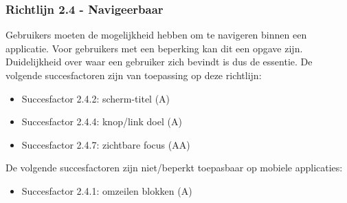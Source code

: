 \subsubsection{Richtlijn 2.4 - Navigeerbaar}
Gebruikers moeten de mogelijkheid hebben om te navigeren binnen een applicatie. Voor gebruikers met een beperking kan dit een opgave zijn. Duidelijkheid over waar een gebruiker zich bevindt is dus de essentie. De volgende succesfactoren zijn van toepassing op deze richtlijn: 
\begin{itemize}
    \item Succesfactor 2.4.2: scherm-titel (A)
     \item Succesfactor 2.4.4: knop/link doel (A)
        \item Succesfactor 2.4.7: zichtbare focus (AA)
\end{itemize}

De volgende succesfactoren zijn niet/beperkt toepasbaar op mobiele applicaties: 
\begin{itemize}
        \item Succesfactor 2.4.1: omzeilen blokken (A)



\end{itemize}

